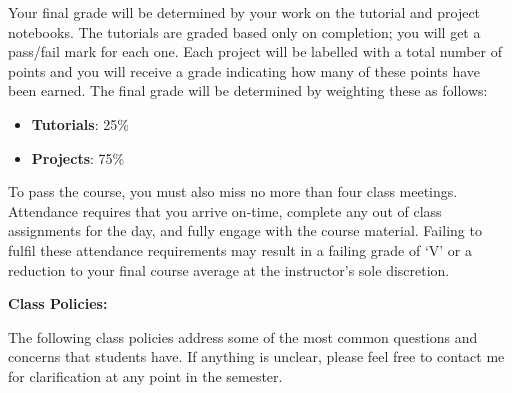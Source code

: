 \documentclass[12pt]{article}
\begin{document}
Your final grade will be determined by your work on the tutorial and project 
notebooks. The tutorials are graded based only on completion; you will get a
pass/fail mark for each one. Each project will be labelled with a total number
of points and you will receive a grade indicating how many of these points have
been earned. The final grade will be determined by weighting these as follows:
\begin{itemize}\setlength\itemsep{0em}
\item \textbf{Tutorials}: 25\%
\item \textbf{Projects}: 75\%
\end{itemize}
To pass the course, you must also miss no more than four class meetings.
Attendance requires that you arrive on-time, complete any out of class
assignments for the day, and fully engage with the course material.
Failing to fulfil these attendance requirements may result in a failing
grade of `V' or a reduction to your final course average at the instructor's
sole discretion.

\bigskip

\textbf{Class Policies:} \vspace{6pt}

The following class policies address some of the most common
questions and concerns that students have. If anything is
unclear, please feel free to contact me for clarification at
any point in the semester.
\end{document}
